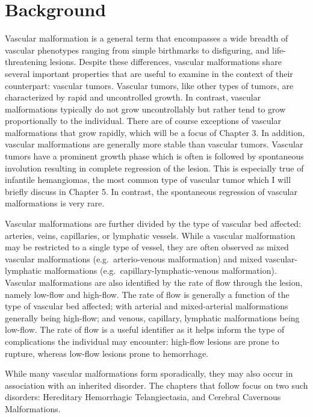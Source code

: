 \section{Background}
Vascular malformation is a general term that encompasses a wide breadth of vascular phenotypes ranging from simple birthmarks to disfiguring, and life-threatening lesions. Despite these differences, vascular malformations share several important properties that are useful to examine in the context of their counterpart: vascular tumors. Vascular tumors, like other types of tumors, are characterized by rapid and uncontrolled growth. In contrast, vascular malformations typically do not grow uncontrollably but rather tend to grow proportionally to the individual. There are of course exceptions of vascular malformations that grow rapidly, which will be a focus of Chapter 3. In addition, vascular malformations are generally more stable than vascular tumors. Vascular tumors have a prominent growth phase which is often is followed by spontaneous involution resulting in complete regression of the lesion. This is especially true of infantile hemangiomas, the most common type of vascular tumor which I will briefly discuss in Chapter 5. In contrast, the spontaneous regression of vascular malformations is very rare.

Vascular malformations are further divided by the type of vascular bed affected: arteries, veins, capillaries, or lymphatic vessels. While a vascular malformation may be restricted to a single type of vessel, they are often observed as mixed vascular malformations (e.g.~arterio-venous malformation) and mixed vascular-lymphatic malformations (e.g.~capillary-lymphatic-venous malformation). Vascular malformations are also identified by the rate of flow through the lesion, namely low-flow and high-flow. The rate of flow is generally a function of the type of vascular bed affected; with arterial and mixed-arterial malformations generally being high-flow; and venous, capillary, lymphatic malformations being low-flow. The rate of flow is a useful identifier as it helps inform the type of complications the individual may encounter: high-flow lesions are prone to rupture, whereas low-flow lesions prone to hemorrhage.

While many vascular malformations form sporadically, they may also occur in association with an inherited disorder. The chapters that follow focus on two such disorders: Hereditary Hemorrhagic Telangiectasia, and Cerebral Cavernous Malformations. 



